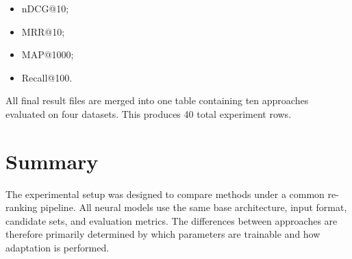 \begin{itemize}
    \item nDCG@10;
    \item MRR@10;
    \item MAP@1000;
    \item Recall@100.
\end{itemize}

All final result files are merged into one table containing ten approaches evaluated on four datasets. This produces 40 total experiment rows.

\section{Summary}
\label{sec:experiments_summary}

The experimental setup was designed to compare methods under a common re-ranking pipeline. All neural models use the same base architecture, input format, candidate sets, and evaluation metrics. The differences between approaches are therefore primarily determined by which parameters are trainable and how adaptation is performed.